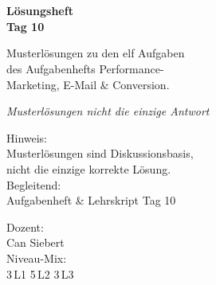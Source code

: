 \documentclass[11pt,a4paper,oneside]{article}
\newcommand{\caveatfontfallback}{\itshape}
\newcommand\caveatfont{\caveatfontfallback}%
\begin{document}
\begin{titlepage}
  \pagestyle{empty}
  \vspace*{1.5cm}
  \\[2pt]
  \noindent{\color{lpAccent}\rule{\linewidth}{1.2pt}}\\[4pt]

  \vspace{3cm}
  {\sffamily\fontsize{30}{34}\selectfont\bfseries\color{lpInk}Lösungsheft\\Tag 10\par}

  \vspace{0.7cm}
  {\sffamily\large\color{lpGray}Musterlösungen zu den elf Aufgaben\\des Aufgabenhefts \textendash{} Performance-\\Marketing, E-Mail \& Conversion.\par}

  \vspace{1.5cm}
  {\caveatfont\LARGE\color{lpGreen}Musterlösungen \textperiodcentered{} nicht die einzige Antwort}\par

  \vfill

  \noindent\begin{minipage}{0.55\linewidth}
    {\sffamily\footnotesize\color{lpGray}Hinweis:}\\
    {\sffamily\small\color{lpInk}Musterlösungen sind Diskussionsbasis,\\nicht die einzige korrekte Lösung.}\\[10pt]
    {\sffamily\footnotesize\color{lpGray}Begleitend:}\\
    {\sffamily\small\color{lpInk}Aufgabenheft \& Lehrskript Tag 10}
  \end{minipage}\hfill
  \begin{minipage}{0.4\linewidth}
    \raggedleft
    {\sffamily\footnotesize\color{lpGray}Dozent:}\\
    {\sffamily\small\color{lpInk}Can Siebert}\\[10pt]
    {\sffamily\footnotesize\color{lpGray}Niveau-Mix:}\\
    {\sffamily\small\color{lpInk}3\,L1 \textperiodcentered{} 5\,L2 \textperiodcentered{} 3\,L3}
  \end{minipage}

  \vspace{0.5cm}
  \noindent{\color{lpAccent}\rule{\linewidth}{0.6pt}}
\end{titlepage}
\end{document}
